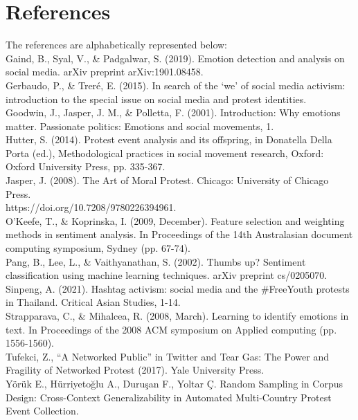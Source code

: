\documentclass[a4paper]{article}
\begin{document}
\section{References}

The references are alphabetically represented below: \\

Gaind, B., Syal, V., \& Padgalwar, S. (2019). Emotion detection and analysis on social media. arXiv preprint arXiv:1901.08458. \\

Gerbaudo, P., \& Treré, E. (2015). In search of the ‘we’ of social media activism: introduction to the special issue on social media and protest identities. \\

Goodwin, J., Jasper, J. M., \& Polletta, F. (2001). Introduction: Why emotions matter. Passionate politics: Emotions and social movements, 1. \\

Hutter, S. (2014). Protest event analysis and its offspring, in Donatella Della Porta (ed.), Methodological practices in social movement research, Oxford: Oxford University Press, pp. 335-367. \\

Jasper, J. (2008). The Art of Moral Protest. Chicago: University of Chicago Press. \\ https://doi.org/10.7208/9780226394961. \\

O’Keefe, T., \& Koprinska, I. (2009, December). Feature selection and weighting methods in sentiment analysis. In Proceedings of the 14th Australasian document computing symposium, Sydney (pp. 67-74). \\

Pang, B., Lee, L., \& Vaithyanathan, S. (2002). Thumbs up? Sentiment classification using machine learning techniques. arXiv preprint cs/0205070. \\

Sinpeng, A. (2021). Hashtag activism: social media and the \#FreeYouth protests in Thailand. Critical Asian Studies, 1-14. \\

Strapparava, C., \& Mihalcea, R. (2008, March). Learning to identify emotions in text. In Proceedings of the 2008 ACM symposium on Applied computing (pp. 1556-1560). \\

Tufekci, Z., “A Networked Public” in Twitter and Tear Gas: The Power and Fragility of Networked Protest (2017). Yale University Press. \\

Yörük E., Hürriyetoğlu A., Duruşan F., Yoltar Ç. Random Sampling in Corpus Design: Cross-Context Generalizability in Automated Multi-Country Protest Event Collection.
\end{document}
